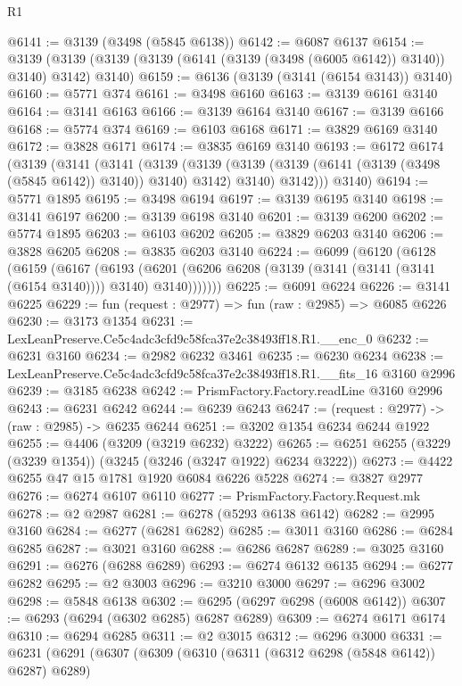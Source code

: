 \begin{lexlean}{R1}
\begin{coremodule}
@6141 := @3139 (@3498 (@5845 @6138))
@6142 := @6087 @6137
@6154 := @3139 (@3139 (@3139 (@3139 (@6141 (@3139 (@3498 (@6005 @6142)) @3140)) @3140) @3142) @3140)
@6159 := @6136 (@3139 (@3141 (@6154 @3143)) @3140)
@6160 := @5771 @374
@6161 := @3498 @6160
@6163 := @3139 @6161 @3140
@6164 := @3141 @6163
@6166 := @3139 @6164 @3140
@6167 := @3139 @6166
@6168 := @5774 @374
@6169 := @6103 @6168
@6171 := @3829 @6169 @3140
@6172 := @3828 @6171
@6174 := @3835 @6169 @3140
@6193 := @6172
    @6174
    (@3139
      (@3141
        (@3141
          (@3139
            (@3139 (@3139 (@3139 (@6141 (@3139 (@3498 (@5845 @6142)) @3140)) @3140) @3142) @3140)
            @3142)))
      @3140)
@6194 := @5771 @1895
@6195 := @3498 @6194
@6197 := @3139 @6195 @3140
@6198 := @3141 @6197
@6200 := @3139 @6198 @3140
@6201 := @3139 @6200
@6202 := @5774 @1895
@6203 := @6103 @6202
@6205 := @3829 @6203 @3140
@6206 := @3828 @6205
@6208 := @3835 @6203 @3140
@6224 := @6099
    (@6120
      (@6128
        (@6159
          (@6167
            (@6193
              (@6201 (@6206 @6208 (@3139 (@3141 (@3141 (@3141 (@6154 @3140)))) @3140) @3140)))))))
@6225 := @6091 @6224
@6226 := @3141 @6225
@6229 := fun (request : @2977) => fun (raw : @2985) => @6085 @6226
@6230 := @3173 @1354
@6231 := LexLeanPreserve.Ce5c4adc3cfd9c58fca37e2c38493ff18.R1.__enc_0
@6232 := @6231 @3160
@6234 := @2982 @6232 @3461
@6235 := @6230 @6234
@6238 := LexLeanPreserve.Ce5c4adc3cfd9c58fca37e2c38493ff18.R1.__fits_16 @3160 @2996
@6239 := @3185 @6238
@6242 := PrismFactory.Factory.readLine @3160 @2996
@6243 := @6231 @6242
@6244 := @6239 @6243
@6247 := (request : @2977) -> (raw : @2985) -> @6235 @6244
@6251 := @3202 @1354 @6234 @6244 @1922
@6255 := @4406 (@3209 (@3219 @6232) @3222)
@6265 := @6251 @6255 (@3229 (@3239 @1354)) (@3245 (@3246 (@3247 @1922) @6234 @3222))
@6273 := @4422 @6255 @47 @15 @1781 @1920 @6084 @6226 @5228
@6274 := @3827 @2977
@6276 := @6274 @6107 @6110
@6277 := PrismFactory.Factory.Request.mk
@6278 := @2 @2987
@6281 := @6278 (@5293 @6138 @6142)
@6282 := @2995 @3160
@6284 := @6277 (@6281 @6282)
@6285 := @3011 @3160
@6286 := @6284 @6285
@6287 := @3021 @3160
@6288 := @6286 @6287
@6289 := @3025 @3160
@6291 := @6276 (@6288 @6289)
@6293 := @6274 @6132 @6135
@6294 := @6277 @6282
@6295 := @2 @3003
@6296 := @3210 @3000
@6297 := @6296 @3002
@6298 := @5848 @6138
@6302 := @6295 (@6297 @6298 (@6008 @6142))
@6307 := @6293 (@6294 (@6302 @6285) @6287 @6289)
@6309 := @6274 @6171 @6174
@6310 := @6294 @6285
@6311 := @2 @3015
@6312 := @6296 @3000
@6331 := @6231
    (@6291
      (@6307
        (@6309
          (@6310 (@6311 (@6312 @6298 (@5848 @6142)) @6287) @6289)

\end{coremodule}
\end{lexlean}

